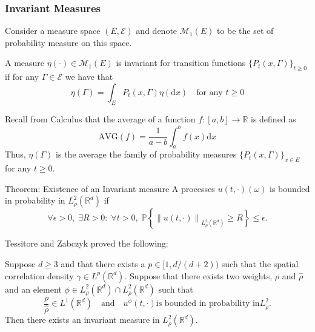 \documentclass{beamer}%
\numberwithin{equation}{section}
\newcommand{\R}{\mathbb{R}}
\newcommand{\Norm}[1]{\left\|  #1   \right\|}
\newcommand{\ud}{\ensuremath{\mathrm{d} }}
\begin{document}
\begin{frame}[t]
	\frametitle{Invariant Measures}
Consider a measure space $(E, \mathscr{E})$ and denote $\mathcal{M}_1(E)$ to be the set of probability measure on this space.
	\begin{definition} 
		A measure $\eta(\cdot) \in \mathcal M_1(E)$ is invariant for transition functions $\{P_t(x,\Gamma)\} _{t\ge 0}$ if for any $\Gamma \in \mathscr E$ we have that $$ \eta(\Gamma) = \int_E P_t(x,\Gamma)\eta(\ud x) \quad \text{for any $t\ge 0$} $$
	\end{definition}
	
	Recall from Calculus that the average of a function $f:[a,b] \to \R$ is defined as
	$$ \text{AVG}(f) = \dfrac{1}{a-b}\int_a^b f(x) \ud x$$
	Thus,  $\eta(\Gamma)$ is the average the family of probability measures $\{P_t(x,\Gamma)\}_{x \in E}$ for any $t \ge 0$.
	
\end{frame}

\begin{frame}{Theorem: Existence of an Invariant measure}
	A processes $u(t,\cdot)(\omega)$ is bounded in probability in $L^2_{\rho}(\R^d)$ if
	\[
	\forall \epsilon >0, \; \exists R>0: \; \forall t>0, \; \mathbb{P}\left\{ \Norm{u(t,\cdot)}_{L^2_{\rho}(\R^d)} \ge R \right\} \le \epsilon.
	\] 	
	
	Tessitore and Zabczyk proved the following: \vspace{.1in}
	\begin{theorem}
		Suppose $d \ge 3$ and that there exists a $p \in [1,d/(d+2))$ such that the spatial correlation density $\gamma \in L^p(\R^d)$. Suppose that there exists two weights, $\rho$ and $\hat{\rho}$ and an element $\phi \in L^2_{\rho}(\R^d) \cap L^2_{\hat{\rho}}(\R^d)$ such that 
		\[
		\frac{\rho}{\hat{\rho}} \in L^1(\R^d) \quad \text{and} \quad u^\phi(t,\cdot) \text{is bounded in probability in} L^2_{\hat{\rho}} .
		\]
		Then there exists an invariant measure in $L^2_{\rho}(\R^d)$. 
	\end{theorem}
\end{frame}
\end{document}
